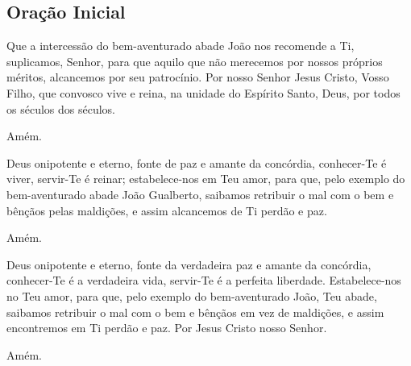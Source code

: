 \documentclass[18pt]{letter}
\begin{document}

\newpage

\begin{justify}
\begin{center}
  \section{Oração Inicial}\label{sec:OraçãoInicial}
\end{center}

Que a intercessão do bem-aventurado abade João nos recomende a Ti, suplicamos, Senhor, para que aquilo que não merecemos por nossos próprios méritos, alcancemos por seu patrocínio. Por nosso Senhor Jesus Cristo, Vosso Filho, que convosco vive e reina, na unidade do Espírito Santo, Deus, por todos os séculos dos séculos.

Amém.

Deus onipotente e eterno, fonte de paz e amante da concórdia, conhecer-Te é viver, servir-Te é reinar; estabelece-nos em Teu amor, para que, pelo exemplo do bem-aventurado abade João Gualberto, saibamos retribuir o mal com o bem e bênçãos pelas maldições, e assim alcancemos de Ti perdão e paz.

Amém.

Deus onipotente e eterno, fonte da verdadeira paz e amante da concórdia, conhecer-Te é a verdadeira vida, servir-Te é a perfeita liberdade. Estabelece-nos no Teu amor, para que, pelo exemplo do bem-aventurado João, Teu abade, saibamos retribuir o mal com o bem e bênçãos em vez de maldições, e assim encontremos em Ti perdão e paz. Por Jesus Cristo nosso Senhor.

Amém.
\end{justify}


\newpage
\end{document}
